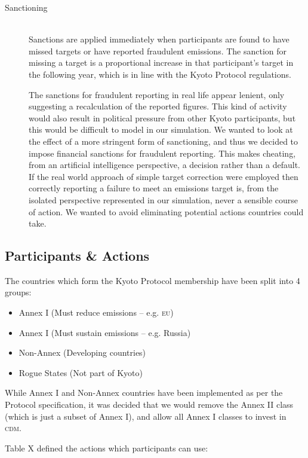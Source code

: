 \begin{description}
\item [Sanctioning] \hfill \\ 
Sanctions are applied immediately when participants are found to have missed targets or have reported fraudulent emissions. The sanction for missing a target is a proportional increase in that participant's target in the following year, which is in line with the Kyoto Protocol regulations.

The sanctions for fraudulent reporting in real life appear lenient, only suggesting a recalculation of the reported figures. This kind of activity would also result in political pressure from other Kyoto participants, but this would be difficult to model in our simulation. We wanted to look at the effect of a more stringent form of sanctioning, and thus we decided to impose financial sanctions for fraudulent reporting. This makes cheating, from an artificial intelligence perspective, a decision rather than a default. If the real world approach of simple target correction were employed then correctly reporting a failure to meet an emissions target is, from the isolated perspective represented in our simulation, never a sensible course of action. We wanted to avoid eliminating potential actions countries could take.
\end{description}

\subsection{Participants \& Actions}
The countries which form the Kyoto Protocol membership have been split into 4 groups:

\begin{itemize}
	\item{Annex I (Must reduce emissions -- e.g. \textsc{eu})}
	\item{Annex I (Must sustain emissions -- e.g. Russia)}
	\item{Non-Annex (Developing countries)}
	\item{Rogue States (Not part of Kyoto)}
\end{itemize}

While Annex I and Non-Annex countries have been implemented as per the Protocol specification, it was decided that we would remove the Annex II class (which is just a subset of Annex I), and allow all Annex I classes to invest in \textsc{cdm}.

Table X defined the actions which participants can use:

